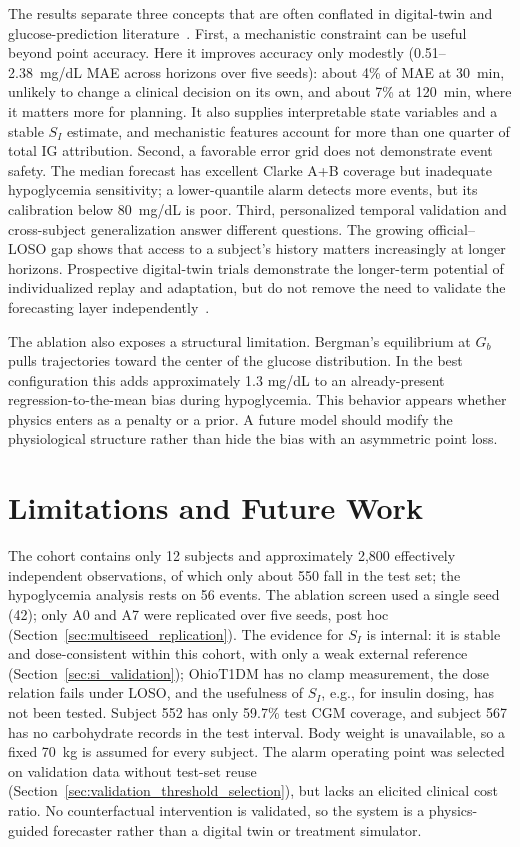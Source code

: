 \documentclass[journal]{IEEEtran}
\begin{document}
The results separate three concepts that are often conflated in digital-twin and glucose-prediction literature~\cite{ref2}. First, a mechanistic constraint can be useful beyond point accuracy. Here it improves accuracy only modestly (0.51--2.38~mg/dL MAE across horizons over five seeds): about 4\% of MAE at 30~min, unlikely to change a clinical decision on its own, and about 7\% at 120~min, where it matters more for planning. It also supplies interpretable state variables and a stable $S_I$ estimate, and mechanistic features account for more than one quarter of total IG attribution. Second, a favorable error grid does not demonstrate event safety. The median forecast has excellent Clarke A+B coverage but inadequate hypoglycemia sensitivity; a lower-quantile alarm detects more events, but its calibration below 80~mg/dL is poor. Third, personalized temporal validation and cross-subject generalization answer different questions. The growing official--LOSO gap shows that access to a subject's history matters increasingly at longer horizons. Prospective digital-twin trials demonstrate the longer-term potential of individualized replay and adaptation, but do not remove the need to validate the forecasting layer independently~\cite{ref18}.

The ablation also exposes a structural limitation. Bergman's equilibrium at $G_b$ pulls trajectories toward the center of the glucose distribution. In the best configuration this adds approximately 1.3 mg/dL to an already-present regression-to-the-mean bias during hypoglycemia. This behavior appears whether physics enters as a penalty or a prior. A future model should modify the physiological structure rather than hide the bias with an asymmetric point loss.

\section{Limitations and Future Work}

The cohort contains only 12 subjects and approximately 2,800 effectively independent observations, of which only about 550 fall in the test set; the hypoglycemia analysis rests on 56 events. The ablation screen used a single seed (42); only A0 and A7 were replicated over five seeds, post hoc (Section~\ref{sec:multiseed_replication}). The evidence for $S_I$ is internal: it is stable and dose-consistent within this cohort, with only a weak external reference (Section~\ref{sec:si_validation}); OhioT1DM has no clamp measurement, the dose relation fails under LOSO, and the usefulness of $S_I$, e.g., for insulin dosing, has not been tested. Subject 552 has only 59.7\% test CGM coverage, and subject 567 has no carbohydrate records in the test interval. Body weight is unavailable, so a fixed 70~kg is assumed for every subject. The alarm operating point was selected on validation data without test-set reuse (Section~\ref{sec:validation_threshold_selection}), but lacks an elicited clinical cost ratio. No counterfactual intervention is validated, so the system is a physics-guided forecaster rather than a digital twin or treatment simulator.
\end{document}
